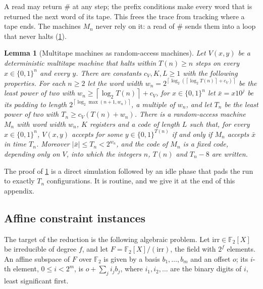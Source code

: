 \documentclass[11pt,letterpaper]{article}
\newtheorem{lemma}[theorem]{Lemma}
\theoremstyle{definition}
\theoremstyle{remark}
\newcommand{\ceil}[1]{\left\lceil #1\right\rceil}
\newcommand{\abs}[1]{\left|#1\right|}
\newcommand{\lgx}{\log_2}
\begin{document}
A read may return \(\#\) at any step; the prefix conditions make every
word that is returned the next word of its tape. This frees the trace
from tracking where a tape ends. The machines \(M_n\) never rely on it:
a read of \(\#\) sends them into a loop that never halts
(\cref{lem:tm-ram}).

\begin{lemma}[Multitape machines as random-access machines]\label{lem:tm-ram}
Let \(V(x,y)\) be a deterministic multitape machine that halts within
\(T(n)\ge n\) steps on every \(x\in\{0,1\}^n\) and every \(y\). There are
constants \(c_V,K,L\ge1\) with the following properties. For each
\(n\ge2\) let the word width
\(w_n=2^{\ceil{\lgx(\ceil{\lgx T(n)}+c_V)}}\) be the least power of two
with \(w_n\ge\ceil{\lgx T(n)}+c_V\), for \(x\in\{0,1\}^n\) let
\(\bar x=x10^j\) be its padding to length
\(2^{\ceil{\lgx\max(n+1,w_n)}}\), a multiple of \(w_n\), and let \(T_n\)
be the least power of two with \(T_n\ge c_V(T(n)+w_n)\). There is a
random-access machine \(M_n\) with word width \(w_n\), \(K\) registers
and a code of length \(L\) such that, for every \(x\in\{0,1\}^n\),
\(V(x,y)\) accepts for some \(y\in\{0,1\}^{T(n)}\) if and only if
\(M_n\) accepts \(\bar x\) in time \(T_n\). Moreover
\(\abs{\bar x}\le T_n<2^{w_n}\), and the code of \(M_n\) is a fixed
code, depending only on \(V\), into which the integers \(n\),
\(T(n)\) and \(T_n-8\) are written.
\end{lemma}

The proof of \cref{lem:tm-ram} is a direct simulation followed by an
idle phase that pads the run to exactly \(T_n\) configurations. It is
routine, and we give it at the end of this appendix.

\subsection{Affine constraint instances}

The target of the reduction is the following algebraic problem. Let
\(\mathrm{irr}\in\mathbb F_2[X]\) be irreducible of degree \(f\), and
let \(F=\mathbb F_2[X]/(\mathrm{irr})\), the field with \(2^f\)
elements. An affine subspace of \(F\) over \(\mathbb F_2\) is given by a
basis \(b_1,\ldots,b_m\) and an offset \(o\); its \(i\)-th element,
\(0\le i<2^m\), is \(o+\sum_ji_jb_j\), where \(i_1,i_2,\ldots\) are the
binary digits of \(i\), least significant first.
\end{document}
